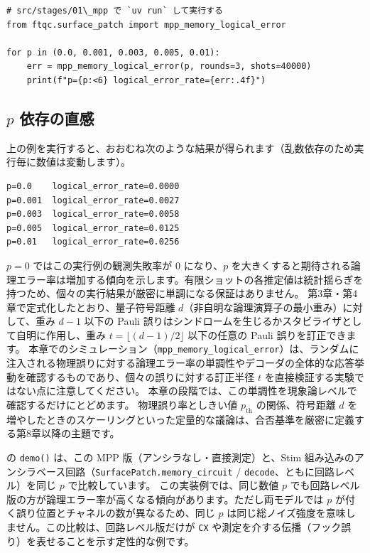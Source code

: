 \begin{lstlisting}[caption={メモリ実験の最小実行例},label=lst:memory_min]
# src/stages/01\_mpp で `uv run` して実行する
from ftqc.surface_patch import mpp_memory_logical_error

for p in (0.0, 0.001, 0.003, 0.005, 0.01):
    err = mpp_memory_logical_error(p, rounds=3, shots=40000)
    print(f"p={p:<6} logical_error_rate={err:.4f}")
\end{lstlisting}

\subsection{$p$ 依存の直感}

上の例を実行すると、おおむね次のような結果が得られます（乱数依存のため実行毎に数値は変動します）。

\begin{lstlisting}[caption={実行例の出力},label=lst:memory_output]
p=0.0    logical_error_rate=0.0000
p=0.001  logical_error_rate=0.0027
p=0.003  logical_error_rate=0.0058
p=0.005  logical_error_rate=0.0125
p=0.01   logical_error_rate=0.0256
\end{lstlisting}

$p=0$ ではこの実行例の観測失敗率が $0$ になり、$p$ を大きくすると期待される論理エラー率は増加する傾向を示します。有限ショットの各推定値は統計揺らぎを持つため、個々の実行結果が厳密に単調になる保証はありません。
第3章・第4章で定式化したとおり、量子符号距離 $d$（非自明な論理演算子の最小重み）に対して、重み $d-1$ 以下の Pauli 誤りはシンドロームを生じるかスタビライザとして自明に作用し、重み $t = \lfloor (d-1)/2 \rfloor$ 以下の任意の Pauli 誤りを訂正できます。
本章でのシミュレーション（\texttt{mpp\_memory\_logical\_error}）は、ランダムに注入される物理誤りに対する論理エラー率の単調性やデコーダの全体的な応答挙動を確認するものであり、個々の誤りに対する訂正半径 $t$ を直接検証する実験ではない点に注意してください。
本章の段階では、この単調性を現象論レベルで確認するだけにとどめます。
物理誤り率としきい値 $p_{\mathrm{th}}$ の関係、符号距離 $d$ を増やしたときのスケーリングといった定量的な議論は、合否基準を厳密に定義する第8章以降の主題です。

 の \texttt{demo()} は、この MPP 版（アンシラなし・直接測定）と、Stim 組み込みのアンシラベース回路（\texttt{SurfacePatch.memory\_circuit} / \texttt{decode}、ともに回路レベル）を同じ $p$ で比較しています。
この実装例では、同じ数値 $p$ でも回路レベル版の方が論理エラー率が高くなる傾向があります。ただし両モデルでは $p$ が付く誤り位置とチャネルの数が異なるため、同じ $p$ は同じ総ノイズ強度を意味しません。この比較は、回路レベル版だけが \texttt{CX} や測定を介する伝播（フック誤り）を表せることを示す定性的な例です\cite{dennis2002topological,fowler2012surface}。

